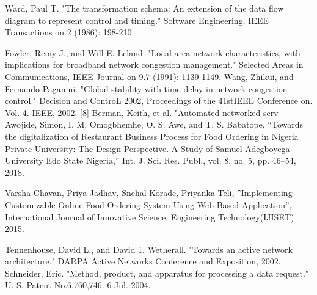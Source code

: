 \documentclass[12pt,a4paper]{report}
\renewcommand{\bibname}{\Large REFERENCES}
\begin{document}
\begin{thebibliography}{99}
\renewcommand{\bibname}{References}

\bibitem{}  Ward, Paul T. "The transformation schema: An
extension of the data flow diagram to represent
control and timing." Software Engineering, IEEE
Transactions on 2 (1986): 198-210.
 
\bibitem{}Fowler, Remy J., and Will E. Leland. "Local area
network characteristics, with implications for
broadband network congestion management."
Selected Areas in Communications, IEEE Journal on
9.7 (1991): 1139-1149.
\bibitem{} Wang, Zhikui, and Fernando Paganini. "Global
stability with time-delay in network congestion
control." Decision and ControL 2002, Proceedings of
the 41stIEEE Conference on. Vol. 4. IEEE, 2002.
[8] Berman, Keith, et al. "Automated networked serv
\bibitem{} Awojide, Simon, I. M. Omogbhemhe, O. S. Awe, and T. S.
Babatope, “Towards the digitalization of Restaurant Business
Process for Food Ordering in Nigeria Private University: The
Design Perspective. A Study of Samuel Adegboyega
University Edo State Nigeria,” Int. J. Sci. Res. Publ., vol. 8,
no. 5, pp. 46–54, 2018.

\bibitem{}  Varsha Chavan, Priya Jadhav, Snehal Korade, Priyanka Teli,
”Implementing Customizable Online Food Ordering System
Using Web Based Application”, International Journal of
Innovative Science, Engineering Technology(IJISET) 2015.

\bibitem{} Tennenhouse, David L., and David 1. Wetherall.
"Towards an active network architecture." DARPA
Active Networks Conference and Exposition, 2002.
\bibitem{}Schneider, Eric. "Method, product, and apparatus for
processing a data request." U. S. Patent No.6,760,746.
6 Jul. 2004.
\end{thebibliography}
\end{document}
